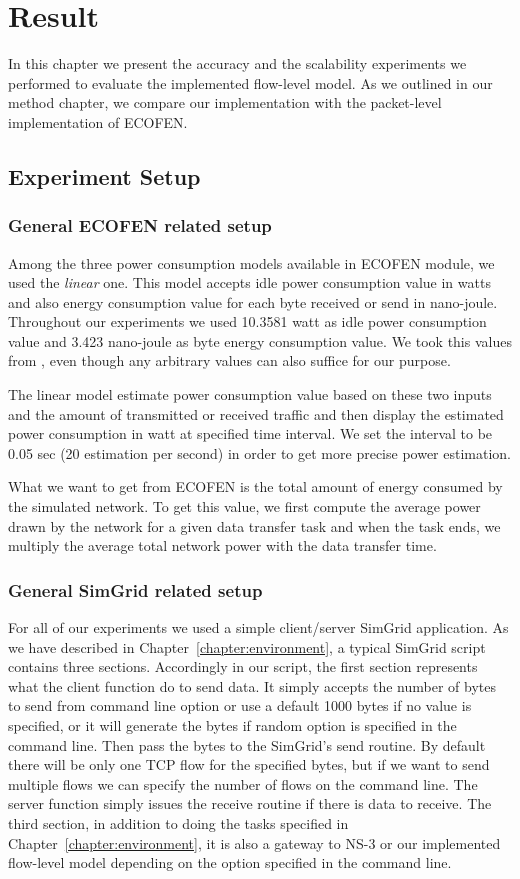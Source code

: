 \chapter{Result}
\label{chapter:evaluation}
In this chapter we present the accuracy and the scalability experiments we performed to evaluate the implemented flow-level model. As we outlined in our method chapter, we compare our implementation with the packet-level implementation of ECOFEN.  
\section{Experiment Setup}

\subsection{General ECOFEN related setup}
Among the three power consumption models available in ECOFEN module, we used the \emph{linear} one. This model accepts idle power consumption value in watts and also energy consumption value for each byte received or send in nano-joule. Throughout our experiments we used 10.3581 watt as idle power consumption value and 3.423 nano-joule as byte energy consumption value. We took this values from \cite{Sivaraman}, even though any arbitrary values can also suffice for our purpose. 

The linear model estimate power consumption value based on these two inputs and the amount of transmitted or received traffic and then display the estimated power consumption in watt at specified time interval. We set the interval to be 0.05 sec (20 estimation per second) in order to get more precise power estimation. 

What we want to get from ECOFEN is the total amount of energy consumed by the simulated network. To get this value, we first compute the average power drawn by the network for a given data transfer task and when the task ends, we multiply the average total network power with the data transfer time. 

\subsection{General SimGrid related setup}
For all of our experiments we used a simple client/server SimGrid application. As we have described in Chapter~\ref{chapter:environment}, a typical SimGrid script contains three sections. Accordingly in our script, the first section represents what the client function do to send data. It simply accepts the number of bytes to send from command line option or use a default 1000 bytes if no value is specified, or it will generate the bytes if random option is specified in the command line. Then pass the bytes to the SimGrid's send routine. By default there will be only one TCP flow for the specified bytes, but if we want to send multiple flows we can specify the number of flows on the command line. The server function simply issues the receive routine if there is data to receive. The third section, in addition to doing the tasks specified in Chapter~\ref{chapter:environment},  it is also a gateway to NS-3 or our implemented flow-level model depending on the option specified in the command line. 

